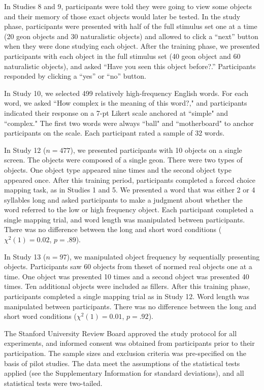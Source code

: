 \documentclass[12pt]{article}
\begin{document}
In Studies 8 and 9, participants were told they were going to view some objects and their memory of those exact objects would later be tested. In the study phase, participants were presented with half of the full stimulus set one at a time (20 geon objects and 30 naturalistic objects) and allowed to click a ``next'' button when they were done studying each object. After the training phase, we presented participants with each object in the full stimulus set (40 geon object and 60 naturalistic objects), and asked ``Have you seen this object before?.'' Participants responded by clicking a ``yes'' or ``no'' button.

In Study 10, we selected 499 relatively high-frequency English words. For each word, we asked ``How complex is the meaning of this word?," and participants indicated their response on a 7-pt Likert scale anchored at ``simple" and ``complex." The first two words were always ``ball" and ``motherboard" to anchor participants on the scale. Each participant rated a sample of 32 words.

In Study 12 ($n = 477$), we presented participants with 10 objects on a single screen. The objects were composed of a single geon. There were two  types of objects. One object type appeared nine times and the second object type appeared once. After this training period, participants completed a forced choice mapping task, as in Studies 1 and 5. We presented a word that was either 2 or 4 syllables long and asked participants to make a judgment about whether the word referred to the low or high frequency object. Each participant completed a single mapping trial, and word length was manipulated between participants. There was no difference between the long and short word conditions ($\chi ^2(1) = 0.02$, $p = .89$).

In Study 13 ($n = 97$), we manipulated object frequency by sequentially presenting objects. Participants saw 60 objects from theset of normed real objects one at a time. One object was presented 10 times and a second object was presented 40 times. Ten additional objects were included as fillers. After this training phase, participants completed a single mapping trial as in Study 12. Word length was manipulated between participants. There was no difference between the long and short word conditions ($\chi ^2(1) = 0.01$, $p = .92$).

The Stanford University Review Board approved the study protocol for all experiments, and informed consent was obtained from participants prior to their participation. The sample sizes and exclusion criteria was pre-specified on the basis of pilot studies. The data meet the assumptions of the statistical tests applied (see the Supplementary Information for standard deviations), and all statistical tests were two-tailed.
\end{document}
